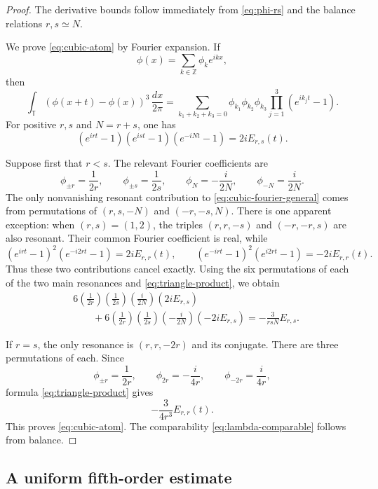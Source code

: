 \documentclass[11pt]{amsart}
\theoremstyle{definition}
\theoremstyle{remark}
\newcommand{\T}{\mathbb T}
\newcommand{\Z}{\mathbb Z}
\begin{document}
\begin{proof}
The derivative bounds follow immediately from \eqref{eq:phi-rs} and the balance relations $r,s\simeq N$.

We prove \eqref{eq:cubic-atom} by Fourier expansion.  If
\[
 \phi(x)=\sum_{k\in\Z}\phi_k e^{ikx},
\]
then
\begin{equation}\label{eq:cubic-fourier-general}
 \int_\T(\phi(x+t)-\phi(x))^3\,\frac{dx}{2\pi}
 =\sum_{k_1+k_2+k_3=0}
 \phi_{k_1}\phi_{k_2}\phi_{k_3}
 \prod_{j=1}^3(e^{ik_jt}-1).
\end{equation}
For positive $r,s$ and $N=r+s$, one has
\begin{equation}\label{eq:triangle-product}
 (e^{irt}-1)(e^{ist}-1)(e^{-iNt}-1)
 =2iE_{r,s}(t).
\end{equation}

Suppose first that $r<s$.  The relevant Fourier coefficients are
\[
 \phi_{\pm r}=\frac1{2r},
 \qquad
 \phi_{\pm s}=\frac1{2s},
 \qquad
 \phi_N=-\frac{i}{2N},
 \qquad
 \phi_{-N}=\frac{i}{2N}.
\]
The only nonvanishing resonant contribution to \eqref{eq:cubic-fourier-general} comes from permutations of $(r,s,-N)$ and $(-r,-s,N)$.  There is one apparent exception: when $(r,s)=(1,2)$, the triples $(r,r,-s)$ and $(-r,-r,s)$ are also resonant.  Their common Fourier coefficient is real, while
\[
 (e^{irt}-1)^2(e^{-i2rt}-1)=2iE_{r,r}(t),
 \qquad
 (e^{-irt}-1)^2(e^{i2rt}-1)=-2iE_{r,r}(t).
\]
Thus these two contributions cancel exactly.  Using the six permutations of each of the two main resonances and \eqref{eq:triangle-product}, we obtain
\begin{align*}
 &6\left(\frac1{2r}\right)
 \left(\frac1{2s}\right)
 \left(\frac{i}{2N}\right)(2iE_{r,s})\\
 &\qquad+
 6\left(\frac1{2r}\right)
 \left(\frac1{2s}\right)
 \left(-\frac{i}{2N}\right)(-2iE_{r,s})
 =-\frac{3}{rsN}E_{r,s}.
\end{align*}

If $r=s$, the only resonance is $(r,r,-2r)$ and its conjugate.  There are three permutations of each.  Since
\[
 \phi_{\pm r}=\frac1{2r},
 \qquad
 \phi_{2r}=-\frac{i}{4r},
 \qquad
 \phi_{-2r}=\frac{i}{4r},
\]
formula \eqref{eq:triangle-product} gives
\[
 -\frac{3}{4r^3}E_{r,r}(t).
\]
This proves \eqref{eq:cubic-atom}.  The comparability \eqref{eq:lambda-comparable} follows from balance.
\end{proof}


\subsection{A uniform fifth-order estimate}
\end{document}

